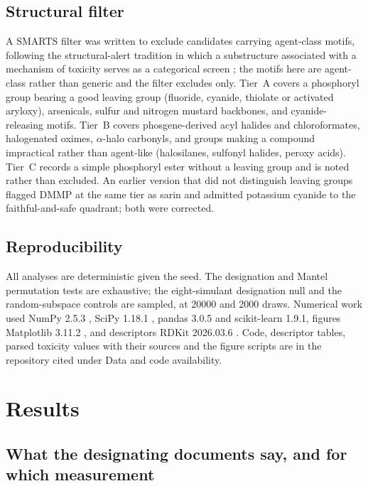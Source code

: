 \documentclass[1p,times]{elsarticle}
\begin{document}
\subsection{Structural filter}
\label{meth:filter}
\label{sec:alerts}
A SMARTS filter was written to exclude candidates carrying agent-class motifs,
following the structural-alert tradition in which a substructure associated with
a mechanism of toxicity serves as a categorical screen \cite{benigni2008,
enoch2011}; the motifs here are agent-class rather than generic and the filter
excludes only. Tier~A covers a phosphoryl group bearing a good leaving group
(fluoride, cyanide, thiolate or activated aryloxy), arsenicals, sulfur and
nitrogen mustard backbones, and cyanide-releasing motifs. Tier~B covers
phosgene-derived acyl halides and chloroformates, halogenated oximes,
$\alpha$-halo carbonyls, and groups making a compound impractical rather than
agent-like (halosilanes, sulfonyl halides, peroxy acids). Tier~C records a
simple phosphoryl ester without a leaving group and is noted rather than
excluded. An earlier version that did not
distinguish leaving groups flagged DMMP at the same tier as sarin and admitted
potassium cyanide to the faithful-and-safe quadrant; both were corrected.

\subsection{Reproducibility}
All analyses are deterministic given the seed. The designation and Mantel
permutation tests are exhaustive; the eight-simulant designation null and the
random-subspace controls are sampled, at 20000 and 2000 draws. Numerical work used NumPy 2.5.3 \cite{numpy2020},
SciPy 1.18.1 \cite{scipy2020}, pandas 3.0.5 \cite{mckinney2010} and scikit-learn
1.9.1, figures Matplotlib 3.11.2 \cite{matplotlib2007}, and descriptors RDKit
2026.03.6 \cite{rdkit}.
Code, descriptor tables, parsed toxicity values with their sources and the
figure scripts are in the repository cited under Data and code availability.

\section{Results}

\subsection{What the designating documents say, and for which measurement}
\label{res:docs}
\end{document}
